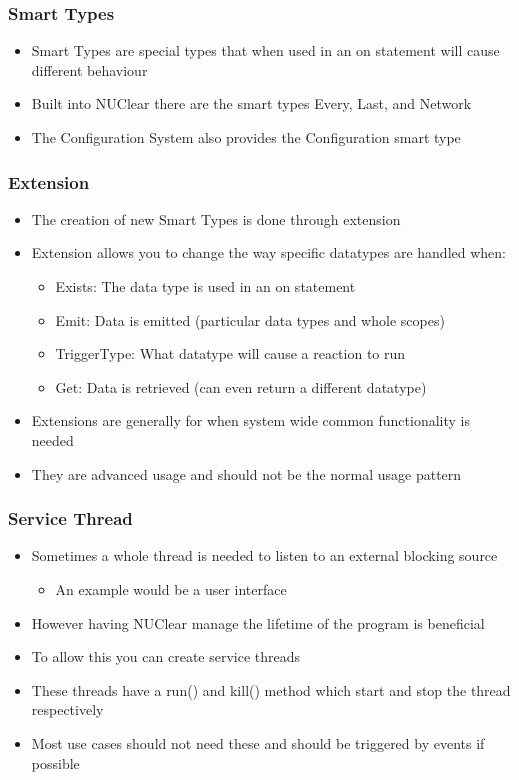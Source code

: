 \documentclass{beamer}
\begin{document}
\begin{frame}
	\frametitle{Smart Types}
	\begin{itemize}
		\item Smart Types are special types that when used in an on statement will cause different behaviour
		\item Built into NUClear there are the smart types Every, Last, and Network
		\item The Configuration System also provides the Configuration smart type
	\end{itemize}
\end{frame}

\begin{frame}
	\frametitle{Extension}
	\begin{itemize}
		\item The creation of new Smart Types is done through extension
		\item Extension allows you to change the way specific datatypes are handled when:
			\begin{itemize}
				\item Exists: The data type is used in an on statement
				\item Emit: Data is emitted (particular data types and whole scopes)
				\item TriggerType: What datatype will cause a reaction to run
				\item Get: Data is retrieved (can even return a different datatype)
			\end{itemize}
		\item Extensions are generally for when system wide common functionality is needed
		\item They are advanced usage and should not be the normal usage pattern
	\end{itemize}
\end{frame}

\begin{frame}
	\frametitle{Service Thread}
	\begin{itemize}
		\item Sometimes a whole thread is needed to listen to an external blocking source
			\begin{itemize}
				\item An example would be a user interface
			\end{itemize}
		\item However having NUClear manage the lifetime of the program is beneficial
		\item To allow this you can create service threads
		\item These threads have a run() and kill() method which start and stop the thread respectively
		\item Most use cases should not need these and should be triggered by events if possible
	\end{itemize}
\end{frame}
\end{document}
